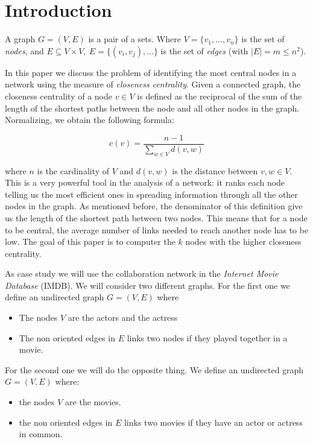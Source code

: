 \section{Introduction}
A graph $G= (V,E)$ is a pair of a sets. Where $V = \{v_1,...,v_n\}$ is the set of \emph{nodes}, and $E \subseteq V \times V, ~ E = \{(v_i,v_j),...\}$  is the set of \emph{edges} (with $|E| = m \leq n^2$). \s

\nd In this paper we discuss the problem of identifying the most central nodes in a network using the measure of \emph{closeness centrality}. Given a connected graph, the closeness centrality of a node $v \in V$ is defined \cite{Sodeur2019} as the reciprocal of the sum of the length of the shortest paths between the node and all other nodes in the graph. Normalizing, we obtain the following formula:

\begin{equation}\label{closeness}
   c(v) = \frac{n-1}{\displaystyle \sum_{w \in V} d(v,w)}
\end{equation}

\nd where $n$ is the cardinality of $V$ and $d(v,w)$ is the distance between $v,w \in V$. This is a very powerful tool in the analysis of a network: it ranks each node telling us the most efficient ones in spreading information through all the other nodes in the graph. As mentioned before, the denominator of this definition give us the length of the shortest path between two nodes. This means that for a node to be central, the average number of links needed to reach another node has to be low. The goal of this paper is to computer the $k$ nodes with the higher closeness centrality. \s

\noindent As case study we will use the collaboration network in the \emph{Internet Movie Database} (IMDB).  We will consider two different graphs. For the first one we define an undirected graph $G=(V,E)$ where
\begin{itemize}
    \item The nodes $V$ are the actors and the actress
    \item The non oriented edges in $E$ links two nodes if they played together in a movie.
\end{itemize}
For the second one we will do the opposite thing. We define an undirected graph $G=(V,E)$ where:
\begin{itemize}
    \item the nodes $V$ are the movies.
    \item the non oriented edges in $E$ links two movies if they have an actor or actress in common.
\end{itemize}

